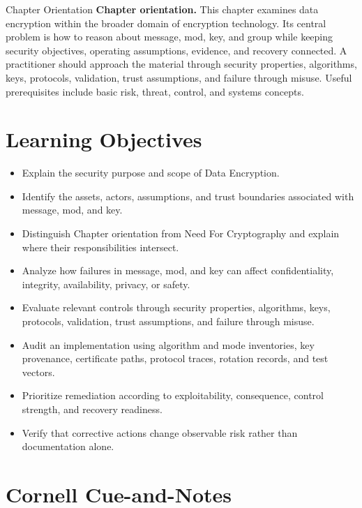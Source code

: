 \documentclass[11pt,letterpaper]{article}
\title{\CornellDocumentTitle}
\author{}
\date{}
\begin{document}
\maketitle
\begin{CornellOverviewBox}{Chapter Orientation}
\textbf{Chapter orientation.} This chapter examines data encryption within the broader domain of encryption technology. Its central problem is how to reason about message, mod, key, and group while keeping security objectives, operating assumptions, evidence, and recovery connected. A practitioner should approach the material through security properties, algorithms, keys, protocols, validation, trust assumptions, and failure through misuse. Useful prerequisites include basic risk, threat, control, and systems concepts.
\end{CornellOverviewBox}
\section*{Learning Objectives}
\begin{itemize}
\item Explain the security purpose and scope of Data Encryption.
\item Identify the assets, actors, assumptions, and trust boundaries associated with message, mod, and key.
\item Distinguish Chapter orientation from Need For Cryptography and explain where their responsibilities intersect.
\item Analyze how failures in message, mod, and key can affect confidentiality, integrity, availability, privacy, or safety.
\item Evaluate relevant controls through security properties, algorithms, keys, protocols, validation, trust assumptions, and failure through misuse.
\item Audit an implementation using algorithm and mode inventories, key provenance, certificate paths, protocol traces, rotation records, and test vectors.
\item Prioritize remediation according to exploitability, consequence, control strength, and recovery readiness.
\item Verify that corrective actions change observable risk rather than documentation alone.
\end{itemize}
\section*{Cornell Cue-and-Notes}
\end{document}
